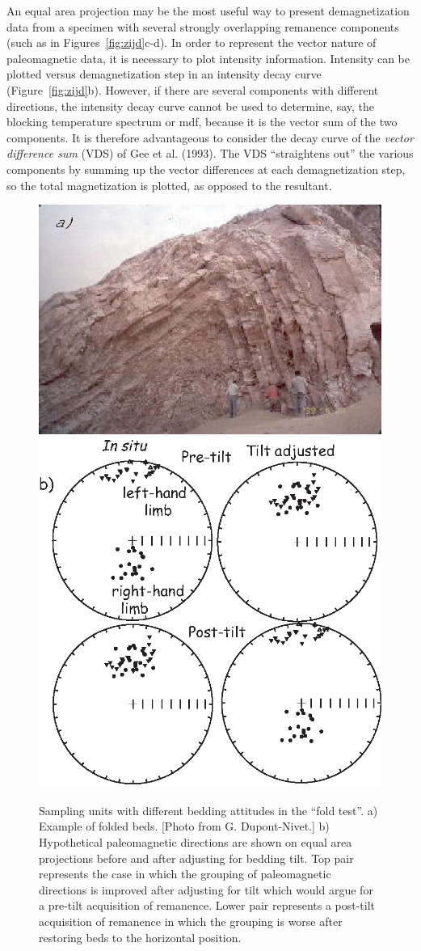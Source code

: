 % 
An equal area projection may be the most useful way to present demagnetization data from a
specimen with several strongly overlapping remanence
 components (such as in
Figures~\ref{fig:zijd}c-d).    In order to represent the vector nature of
paleomagnetic data, it is
necessary to plot intensity information.  Intensity can be
plotted versus demagnetization step in an 
%
{intensity decay curve} (Figure~\ref{fig:zijd}b).  
However, if there are several components with different
directions, the intensity decay curve cannot be used to determine,
say, the blocking temperature spectrum or mdf, because it is the vector
sum of the two components.  It is therefore
 advantageous to consider the decay curve of
%
the {\it vector difference sum} (VDS) of
 Gee et al. (1993). \nocite{gee93}
 The VDS
 ``straightens out'' the various components by summing up the vector differences
at each demagnetization step, so the total magnetization is plotted, as
opposed to the resultant.    
 

\begin{figure}[htb]
\centering  \includegraphics[width=7 cm]{EPSfiles/foldtesta.eps}
\centering  \includegraphics[width=7 cm]{EPSfiles/foldtestb.eps}
\caption{Sampling units with different bedding attitudes in the ``fold
test''. a) Example of folded beds. [Photo from G. Dupont-Nivet.]  b) Hypothetical paleomagnetic directions are shown on equal area projections before and after
adjusting for bedding tilt.  Top pair represents the case in which the grouping of paleomagnetic directions is improved after adjusting for tilt which would argue for  a pre-tilt acquisition of remanence.  Lower pair represents a post-tilt acquisition of remanence in which the grouping is worse after restoring beds to the horizontal position. }
\label{fig:fold}
\end{figure} 


